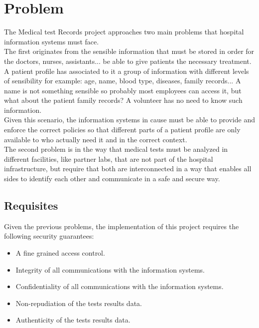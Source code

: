 \section{Problem}

The Medical test Records project approaches two main problems that hospital information systems must face. \\

The first originates from the sensible information that must be stored in order for the doctors, nurses, assistants... be able to give patients the necessary treatment. A patient profile has associated to it a group of information with different levels of sensibility for example: age, name, blood type, diseases, family records... 
A name is not something sensible so probably most employees can access it, but what about the patient family records? A volunteer has no need to know such information. \\

Given this scenario, the information systems in cause must be able to provide and enforce the correct policies so that different parts of a patient profile are only available to who actually need it and in the correct context. \\

The second problem is in the way that medical tests must be analyzed in different facilities, like partner labs, that are not part of the hospital infrastructure, but require that both are interconnected in a way that enables all sides to identify each other and communicate in a safe and secure way. \\

\subsection{Requisites}

Given the previous problems, the implementation of this project requires the following security guarantees:
\begin{itemize}
	\item A fine grained access control.
	\item Integrity of all communications with the information systems.
	\item Confidentiality of all communications with the information systems.
	\item Non-repudiation of the tests results data.
	\item Authenticity of the tests results data.
\end{itemize}

